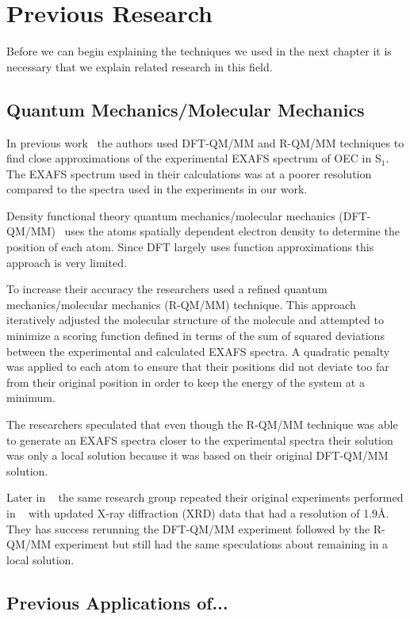 \chapter{Previous Research}

Before we can begin explaining the techniques we used in the next chapter it is necessary that we explain related research in this field.

\section{Quantum Mechanics/Molecular Mechanics}

In previous work~\cite{sproviero2008model} the authors used DFT-QM/MM and R-QM/MM techniques to find close approximations of the experimental EXAFS spectrum of OEC in S$_{1}$. The EXAFS spectrum used in their calculations was at a poorer resolution compared to the spectra used in the experiments in our work.

Density functional theory quantum mechanics/molecular mechanics (DFT-QM/MM)~\cite{parr1989density} uses the atoms spatially dependent electron density to determine the position of each atom. Since DFT largely uses function approximations this approach is very limited.

To increase their accuracy the researchers used a refined quantum mechanics/molecular mechanics (R-QM/MM) technique. This approach iteratively adjusted the molecular structure of the molecule and attempted to minimize a scoring function defined in terms of the sum of squared deviations between the experimental and calculated EXAFS spectra. A quadratic penalty was applied to each atom to ensure that their positions did not deviate too far from their original position in order to keep the energy of the system at a minimum.

The researchers speculated that even though the R-QM/MM technique was able to generate an EXAFS spectra closer to the experimental spectra their solution was only a local solution because it was based on their original DFT-QM/MM solution.

Later in ~\cite{luber2011s1} the same research group repeated their original experiments performed in ~\cite{sproviero2008model} with updated X-ray diffraction (XRD) data that had a resolution of 1.9\AA. They has success rerunning the DFT-QM/MM experiment followed by the R-QM/MM experiment but still had the same speculations about remaining in a local solution.

\section{Previous Applications of...}

